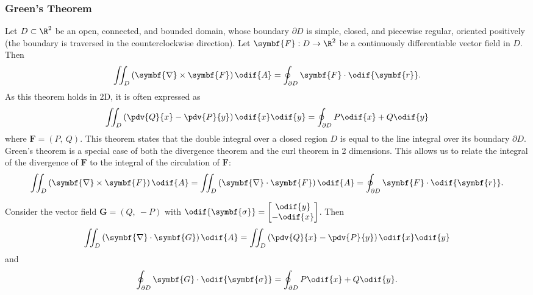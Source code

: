 \documentclass{article}
\begin{document}
\subsubsection{Green's Theorem}
Let \(D \subset \R^2\) be an open, connected, and bounded domain, whose
boundary \(\partial D\) is simple, closed, and piecewise regular, oriented
    positively (the boundary is traversed in the counterclockwise
    direction). Let \(\symbf{F} : D \to \R^2\) be a continuously
    differentiable vector field in \(D\). Then
\begin{equation*}
    \iint_D \left( \symbf{\nabla} \times \symbf{F} \right) \odif{A} = \oint_{\partial D} \symbf{F} \cdot \odif{\symbf{r}}.
\end{equation*}
As this theorem holds in 2D, it is often expressed as
\begin{equation*}
    \iint_D \left( \pdv{Q}{x} - \pdv{P}{y} \right) \odif{x} \odif{y} = \oint_{\partial D} P \odif{x} + Q \odif{y}
\end{equation*}
where \(\symbf{F} = \left( P,\: Q \right)\). This theorem states
that the double integral over a closed region \(D\) is equal to the line
integral over its boundary \(\partial D\).
Green's theorem is a special case of both the divergence theorem and
the curl theorem in 2 dimensions. This allows us to relate the integral
of the divergence of \(\symbf{F}\) to the integral of the circulation
of \(\symbf{F}\):
\begin{equation*}
    \iint_D \left( \symbf{\nabla} \times \symbf{F} \right) \odif{A} = \iint_D \left( \symbf{\nabla} \cdot \symbf{F} \right) \odif{A} = \oint_{\partial D} \symbf{F} \cdot \odif{\symbf{r}}.
\end{equation*}
\begin{corollary}
    Consider the vector field \(\symbf{G} = \left( Q,\: -P \right)\)
    with \(\odif{\symbf{\sigma}} =
    \begin{bmatrix}
        \odif{y} \\
        -\odif{x}
    \end{bmatrix}
    \).
    Then
    \begin{equation*}
        \iint_D \left( \symbf{\nabla} \cdot \symbf{G} \right) \odif{A} = \iint_D \left( \pdv{Q}{x} - \pdv{P}{y} \right) \odif{x} \odif{y}
    \end{equation*}
    and
    \begin{equation*}
        \oint_{\partial D} \symbf{G} \cdot \odif{\symbf{\sigma}} = \oint_{\partial D} P \odif{x} + Q \odif{y}.
    \end{equation*}
\end{corollary}
\end{document}
